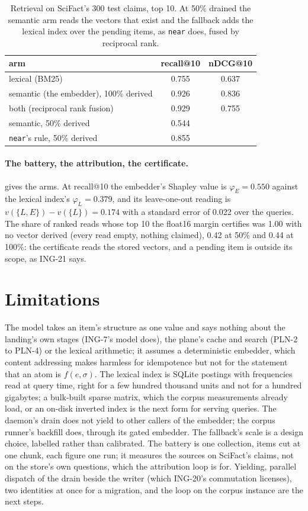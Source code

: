 \documentclass[11pt]{article}
\theoremstyle{plain}
\theoremstyle{definition}
\theoremstyle{remark}
\newcommand{\code}[1]{\texttt{#1}}
\newcommand{\ing}[1]{ING-#1}
\newcommand{\nQueries}{300}
\newcommand{\recLex}{0.755}
\newcommand{\recSem}{0.926}
\newcommand{\recBoth}{0.929}
\newcommand{\recSemHalf}{0.544}
\newcommand{\recFallHalf}{0.855}
\newcommand{\ndcgLex}{0.637}
\newcommand{\ndcgSem}{0.836}
\newcommand{\ndcgBoth}{0.755}
\newcommand{\shapE}{0.550}
\newcommand{\shapL}{0.379}
\newcommand{\looE}{0.174}
\newcommand{\looSE}{0.022}
\newcommand{\certZero}{1.00}
\newcommand{\certHalf}{0.42}
\newcommand{\certFull}{0.44}
\begin{document}
\begin{table}[t]
\centering
\caption{Retrieval on SciFact's \nQueries{} test claims, top 10. At 50\% drained the semantic arm
reads the vectors that exist and the fallback adds the lexical index over the pending items, as
\code{near} does, fused by reciprocal rank.}
\label{tab:battery}
\begin{tabular}{lcc}
\toprule
arm & recall@10 & nDCG@10 \\
\midrule
lexical (BM25) & \recLex & \ndcgLex \\
semantic (the embedder), 100\% derived & \recSem & \ndcgSem \\
both (reciprocal rank fusion) & \recBoth & \ndcgBoth \\
semantic, 50\% derived & \recSemHalf & \\
\code{near}'s rule, 50\% derived & \recFallHalf & \\
\bottomrule
\end{tabular}
\end{table}

\paragraph{The battery, the attribution, the certificate.}  gives the arms. At
recall@10 the embedder's Shapley value is $\varphi_E = \shapE$ against the lexical index's
$\varphi_L = \shapL$, and its leave-one-out reading is $v(\{L, E\}) - v(\{L\}) = \looE$ with a
standard error of \looSE{} over the queries. The share of ranked reads whose top 10 the float16
margin certifies was \certZero{} with no vector derived (every read empty, nothing claimed),
\certHalf{} at 50\% and \certFull{} at 100\%: the certificate reads the stored vectors, and a
pending item is outside its scope, as \ing{21} says.

\section{Limitations}

The model takes an item's structure as one value and says nothing about the landing's own stages
(\ing{7}'s model does), the plane's cache and search (PLN-2 to PLN-4) or the lexical arithmetic;
it assumes a deterministic embedder, which content addressing makes harmless for idempotence but
not for the statement that an atom is $f(e, \sigma)$. The lexical index is SQLite postings with
frequencies read at query time, right for a few hundred thousand units and not for a hundred
gigabytes; a bulk-built sparse matrix, which the corpus measurements already load, or an on-disk
inverted index is the next form for serving queries. The daemon's drain does not yield to other
callers of the embedder; the corpus runner's backfill does, through its gated embedder. The
fallback's scale is a design choice, labelled rather than calibrated. The battery is one
collection, items cut at one chunk, each figure one run; it measures the sources on SciFact's
claims, not on the store's own questions, which the attribution loop is for. Yielding, parallel dispatch of the drain beside the
writer (which \ing{20}'s commutation licenses), two identities at once for a migration, and the
loop on the corpus instance are the next steps.
\end{document}
